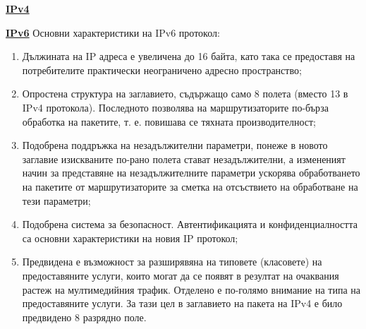 \documentclass{article}
\begin{document}
\textbf{\underline{IPv4}}

\textbf{\underline{IPv6}} \newline\newline
Основни характеристики на IPv6 протокол:
\begin{enumerate}
    \item Дължината на IP адреса е увеличена до 16 байта, като така се предоставя на потребителите практически неограничено
    адресно пространство;
    \item Опростена структура на заглавието, съдържащо само 8 полета (вместо 13 в IPv4 протокола). Последното позволява на
    маршрутизаторите по-бърза обработка на пакетите, т. е. повишава се тяхната производителност;
    \item Подобрена поддръжка на незадължителни параметри, понеже в новото заглавие изискваните по-рано полета стават
    незадължителни, а измененият начин за представяне на незадължителните параметри ускорява обработването на пакетите от
    маршрутизаторите за сметка на отсъствието на обработване на тези параметри;
    \item Подобрена система за безопасност. Автентификацията и конфиденциалността са основни характеристики на новия IP протокол;
    \item Предвидена е възможност за разширявяна на типовете (класовете) на предоставяните услуги, които могат да се появят в
    резултат на очаквания растеж на мултимедийния трафик. Отделено е по-голямо внимание на типа на предоставяните услуги. За тази
    цел в заглавието на пакета на IPv4 е било предвидено 8 разрядно поле.
\end{enumerate}
\end{document}
